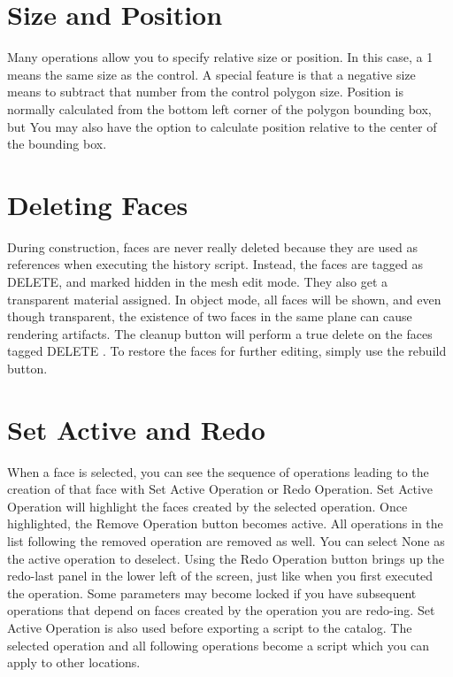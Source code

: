 \documentclass[11pt]{article}
\begin{document}
    \section{Size and Position}
    Many operations allow you to specify relative size or position.
    In this case, a 1 means the same size as the control.
    A special feature is that a negative size means to subtract that number from the control polygon size.
    Position is normally calculated from the bottom left corner of the polygon bounding box,
    but You may also have the option to calculate position relative to the center of the bounding box.

    \section{Deleting Faces}
    During construction, faces are never really deleted because they are used as references when executing the history
    script.
    Instead, the faces are tagged as DELETE, and marked hidden in the mesh edit mode.
    They also get a transparent material assigned.
    In object mode, all faces will be shown, and even though transparent, the existence of two faces in the same plane
    can cause rendering artifacts.
    The cleanup button will perform a true delete on the faces tagged DELETE .
    To restore the faces for further editing, simply use the rebuild button.

    \section{Set Active and Redo}
    When a face is selected, you can see the sequence of operations leading to the creation of that face with
    Set Active Operation or Redo Operation.
    Set Active Operation will highlight the faces created by the selected operation.
    Once highlighted, the Remove Operation button becomes active.
    All operations in the list following the removed operation are removed as well.
    You can select None as the active operation to deselect.
    Using the Redo Operation button brings up the redo-last panel in the lower left of the screen, just like when
    you first executed the operation.
    Some parameters may become locked if you have subsequent operations that depend on faces created by the operation
    you are redo-ing.
    Set Active Operation is also used before exporting a script to the catalog.
    The selected operation and all following operations become a script which you can apply to other locations.
\end{document}
